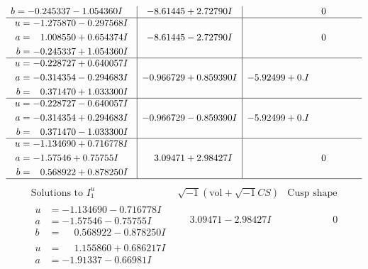\documentclass[1p]{elsarticle_modified}
\theoremstyle{definition}
\newcommand{\I}{\sqrt{-1}}
\begin{document}
$$\begin{array}{c|c|c}
\begin{aligned}
b &= -0.245337 - 1.054360 I\end{aligned}
 & -8.61445 + 2.72790 I & \phantom{-0.000000 } 0 \\ \hline\begin{aligned}
u &= -1.275870 - 0.297568 I \\
a &= \phantom{-}1.008550 + 0.654374 I \\
b &= -0.245337 + 1.054360 I\end{aligned}
 & -8.61445 - 2.72790 I & \phantom{-0.000000 } 0 \\ \hline\begin{aligned}
u &= -0.228727 + 0.640057 I \\
a &= -0.314354 - 0.294683 I \\
b &= \phantom{-}0.371470 + 1.033300 I\end{aligned}
 & -0.966729 + 0.859390 I & -5.92499 + 0. I\phantom{ +0.000000I} \\ \hline\begin{aligned}
u &= -0.228727 - 0.640057 I \\
a &= -0.314354 + 0.294683 I \\
b &= \phantom{-}0.371470 - 1.033300 I\end{aligned}
 & -0.966729 - 0.859390 I & -5.92499 + 0. I\phantom{ +0.000000I} \\ \hline\begin{aligned}
u &= -1.134690 + 0.716778 I \\
a &= -1.57546 + 0.75755 I \\
b &= \phantom{-}0.568922 + 0.878250 I\end{aligned}
 & \phantom{-}3.09471 + 2.98427 I & \phantom{-0.000000 } 0\\
 \hline 
 \end{array}$$\newpage$$\begin{array}{c|c|c}  
\text{Solutions to }I^u_{1}& \I (\text{vol} + \sqrt{-1}CS) & \text{Cusp shape}\\
 \hline 
\begin{aligned}
u &= -1.134690 - 0.716778 I \\
a &= -1.57546 - 0.75755 I \\
b &= \phantom{-}0.568922 - 0.878250 I\end{aligned}
 & \phantom{-}3.09471 - 2.98427 I & \phantom{-0.000000 } 0 \\ \hline\begin{aligned}
u &= \phantom{-}1.155860 + 0.686217 I \\
a &= -1.91337 - 0.66981 I \\

\end{aligned}
\end{array}$$
\end{document}
